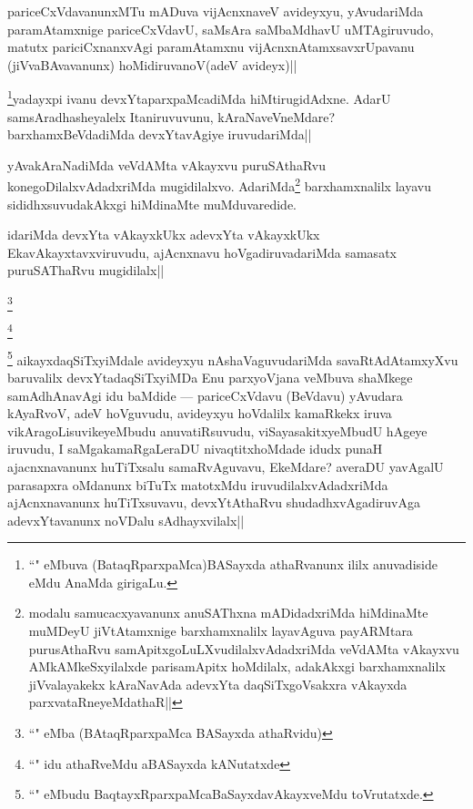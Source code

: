 
\begin{artha}
pariceCxVdavanunxMTu mADuva vijAcnxnaveV avideyxyu, yAvudariMda paramAtamxnige 
pariceCxVdavU, saMsAra saMbaMdhavU uMTAgiruvudo, matutx pariciCxnanxvAgi paramAtamxnu 
vijAcnxnAtamxsavxrUpavanu (jiVvaBAvavanunx) hoMidiruvanoV(adeV avideyx)||
\end{artha}

\begin{artha}
\footnote{``\stext" eMbuva (BataqRparxpaMca)BASayxda athaRvanunx ililx anuvadiside eMdu AnaMda girigaLu.}yadayxpi ivanu devxYtaparxpaMcadiMda hiMtirugidAdxne. AdarU samsAradhasheyalelx Itaniruvuvunu, kAraNaveVneMdare? barxhamxBeVdadiMda devxYtavAgiye iruvudariMda||
\end{artha}

\begin{artha}
yAvakAraNadiMda veVdAMta vAkayxvu puruSAthaRvu konegoDilalxvAdadxriMda mugidilalxvo. AdariMda\footnote[2]{modalu samucacxyavanunx anuSAThxna mADidadxriMda hiMdinaMte muMDeyU jiVtAtamxnige barxhamxnalilx layavAguva payARMtara purusAthaRvu samApitxgoLuLXvudilalxvAdadxriMda veVdAMta vAkayxvu AMkAMkeSxyilalxde parisamApitx hoMdilalx, adakAkxgi barxhamxnalilx jiVvalayakekx kAraNavAda adevxYta daqSiTxgoVsakxra vAkayxda parxvataRneyeMdathaR||} barxhamxnalilx layavu sididhxsuvudakAkxgi hiMdinaMte muMduvaredide.
\end{artha}

\begin{artha}
idariMda devxYta vAkayxkUkx adevxYta vAkayxkUkx EkavAkayxtavxviruvudu, ajAcnxnavu hoVgadiruvadariMda samasatx puruSAThaRvu mugidilalx|| 
\end{artha}

\begin{artha}
\footnote{``\stext" eMba (BAtaqRparxpaMca BASayxda athaRvidu)}
\end{artha}

\begin{artha}
\footnote[2]{``\stext" idu athaRveMdu aBASayxda kANutatxde }
\end{artha}

\begin{artha}
\footnote[3]{``\stext" eMbudu BaqtayxRparxpaMcaBaSayxdavAkayxveMdu toVrutatxde.} aikayxdaqSiTxyiMdale avideyxyu nAshaVaguvudariMda savaRtAdAtamxyXvu baruvalilx devxYtadaqSiTxyiMDa Enu parxyoVjana veMbuva shaMkege samAdhAnavAgi idu baMdide --- pariceCxVdavu (BeVdavu) yAvudara kAyaRvoV, adeV hoVguvudu, avideyxyu hoVdalilx kamaRkekx iruva vikAragoLisuvikeyeMbudu anuvatiRsuvudu, viSayasakitxyeMbudU hAgeye iruvudu, I saMgakamaRgaLeraDU nivaqtitxhoMdade idudx punaH ajacnxnavanunx huTiTxsalu samaRvAguvavu, EkeMdare? averaDU yavAgalU parasapxra oMdanunx biTuTx matotxMdu iruvudilalxvAdadxriMda ajAcnxnavanunx huTiTxsuvavu, devxYtAthaRvu shudadhxvAgadiruvAga adevxYtavanunx noVDalu sAdhayxvilalx||
\end{artha}


